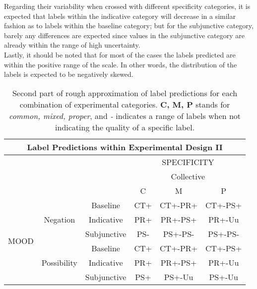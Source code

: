 Regarding their variability when crossed with different specificity categories, it is expected that labels within the indicative category will decrease in a similar fashion as to labels within the baseline category; but for the subjunctive category, barely any differences are expected since values in the subjunctive category are already within the range of high uncertainty.\\

Lastly, it should be noted that for most of the cases the labels predicted are within the positive range of the scale. In other words, the distribution of the labels is expected to be negatively skewed.\\

\begin{table}
\centering
\begin{tabular}{|c|c|c|c|c|c|}
\hline
\multicolumn{6}{|c|}{Label Predictions within Experimental Design II}\\\hline
                      & & &\multicolumn{3}{c|}{SPECIFICITY} \\\cline{4-6} 
                      & & &\multicolumn{3}{c|}{Collective}\\\cline{4-6} 
                      & & & C & M & P \\\hline 
\multirow{6}{*}{MOOD} & \multirow{3}{*}{Negation} & Baseline  & CT+ & CT+-PR+ & CT+-PS+\\\cline{3-6}
                      &                           & Indicative & PR+ & PR+-PS+ & PR+-Uu \\\cline{3-6}
                      &                           & Subjunctive  & PS- & PS+-PS- & PS+-PS-  \\ \cline{2-6}\cline{2-6}                     
                      &\multirow{3}{*}{Possibility}& Baseline & CT+ & CT+-PR+ & CT+-PS+\\\cline{3-6}
                      &                           & Indicative  & PR+ & PR+-PS+ & PR+-Uu\\\cline{3-6}
                      &                           & Subjunctive & PS+ & PS+-Uu & PS+-Uu \\\hline                                                          
\end{tabular}
\caption[Label predictions II.]{Second part of rough approximation of label predictions for each combination of experimental categories. \textbf{C, M, P} stands for \textit{common, mixed, proper}, and \textit{-} indicates a range of labels when not indicating the quality of a specific label.}
\label{tab:pilpredict2}
\end{table}

